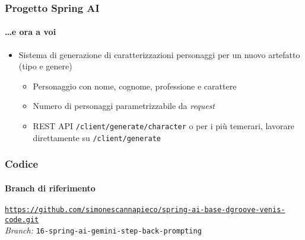 %
\begin{frame}[t,fragile] \frametitle{Progetto Spring AI}
    \framesubtitle{\ldots e ora a voi}
    {\small
        \begin{itemize}[leftmargin=10pt,align=right]
            \item[\alert{\faArrowCircleRight}] Sistema di generazione di \alert{caratterizzazioni personaggi per un nuovo artefatto} (tipo e genere)
            \begin{itemize}[leftmargin=10pt,align=right]
                \item[\alert{\faArrowCircleRight}] Personaggio con nome, cognome, professione e carattere
                \item[\alert{\faArrowCircleRight}] Numero di personaggi parametrizzabile da \textit{request}
                \item[\alert{\faArrowCircleRight}] REST API \texttt{/client/generate/character} o per i più temerari, lavorare direttamente su \texttt{/client/generate}  
            \end{itemize}
        \end{itemize}
    }
\end{frame}
%
\begin{frame}[fragile] \frametitle{Codice}
    \framesubtitle{Branch di riferimento}
	\begin{center}
		{\scriptsize \href{https://github.com/simonescannapieco/spring-ai-base-dgroove-venis-code.git}{\texttt{https://github.com/simonescannapieco/spring-ai-base-dgroove-venis-code.git}}}\\
		\textit{Branch:} \alert{\texttt{16-spring-ai-gemini-step-back-prompting}}
	\end{center}
\end{frame}